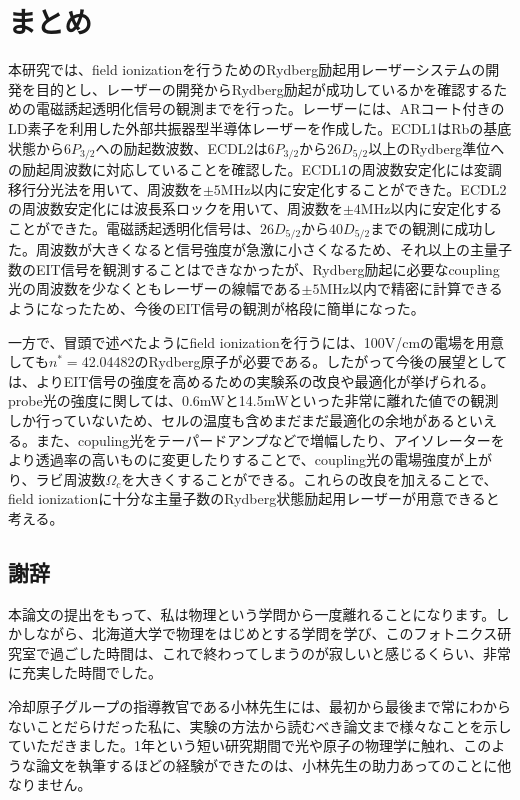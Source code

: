 \documentclass[dvipdfmx]{jsreport}
\begin{document}
\chapter{まとめ}
本研究では、field ionizationを行うためのRydberg励起用レーザーシステムの開発を目的とし、レーザーの開発からRydberg励起が成功しているかを確認するための電磁誘起透明化信号の観測までを行った。レーザーには、ARコート付きのLD素子を利用した外部共振器型半導体レーザーを作成した。ECDL1はRbの基底状態から$6P_{3/2}$への励起数波数、ECDL2は$6P_{3/2}$から$26D_{5/2}$以上のRydberg準位への励起周波数に対応していることを確認した。ECDL1の周波数安定化には変調移行分光法を用いて、周波数を$\pm5$MHz以内に安定化することができた。ECDL2の周波数安定化には波長系ロックを用いて、周波数を$\pm4$MHz以内に安定化することができた。電磁誘起透明化信号は、$26D_{5/2}$から$40D_{5/2}$までの観測に成功した。周波数が大きくなると信号強度が急激に小さくなるため、それ以上の主量子数のEIT信号を観測することはできなかったが、Rydberg励起に必要なcoupling光の周波数を少なくともレーザーの線幅である$\pm5$MHz以内で精密に計算できるようになったため、今後のEIT信号の観測が格段に簡単になった。

一方で、冒頭で述べたようにfield ionizationを行うには、100V/cmの電場を用意しても$n^*=$42.04482のRydberg原子が必要である。したがって今後の展望としては、よりEIT信号の強度を高めるための実験系の改良や最適化が挙げられる。probe光の強度に関しては、0.6mWと14.5mWといった非常に離れた値での観測しか行っていないため、セルの温度も含めまだまだ最適化の余地があるといえる。また、copuling光をテーパードアンプなどで増幅したり、アイソレーターをより透過率の高いものに変更したりすることで、coupling光の電場強度が上がり、ラビ周波数$\Omega_c$を大きくすることができる。これらの改良を加えることで、field ionizationに十分な主量子数のRydberg状態励起用レーザーが用意できると考える。






\section*{謝辞}
本論文の提出をもって、私は物理という学問から一度離れることになります。しかしながら、北海道大学で物理をはじめとする学問を学び、このフォトニクス研究室で過ごした時間は、これで終わってしまうのが寂しいと感じるくらい、非常に充実した時間でした。

冷却原子グループの指導教官である小林先生には、最初から最後まで常にわからないことだらけだった私に、実験の方法から読むべき論文まで様々なことを示していただきました。1年という短い研究期間で光や原子の物理学に触れ、このような論文を執筆するほどの経験ができたのは、小林先生の助力あってのことに他なりません。
\end{document}
